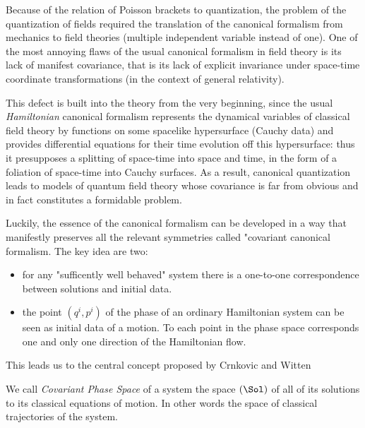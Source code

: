 \documentclass[Main]{subfiles}
\begin{document}
		Because of the relation of Poisson brackets to quantization, the problem of the quantization of fields required the translation of the canonical formalism from mechanics to field theories (multiple independent variable instead of one).
		One of the most annoying flaws of the usual canonical formalism in field theory is its lack of manifest covariance, that is its lack of explicit invariance under space-time coordinate transformations (in the context of general relativity). 
			
			This defect is built into the theory from the very beginning, since the usual \emph{Hamiltonian} canonical formalism represents the dynamical variables of classical field theory by functions on some spacelike hypersurface (Cauchy data) and provides differential equations for their time evolution off this hypersurface: 
			thus it presupposes a splitting of space-time into space and time, in the form of a foliation of space-time into Cauchy surfaces.	
			As a result, canonical quantization leads to models of quantum field theory whose covariance is far from obvious and in fact constitutes a formidable problem.
		
		Luckily, the essence of the canonical formalism can be developed in a way that manifestly preserves all the relevant symmetries called "covariant canonical formalism.
		The key idea are two:
		\begin{itemize}
			\item  for any "sufficently well behaved" system there is a one-to-one correspondence between solutions and initial data.
			\item the point $(q^i,p^i)$ of the phase of an ordinary Hamiltonian system can be seen as initial data of a motion.
						To each point in the phase space corresponds one and only one direction of the Hamiltonian flow.
		\end{itemize}
		This leads us to the central concept proposed by Crnkovic and Witten\cite{Crnkovic1999}
		
		\begin{definition}
			We call \emph{Covariant Phase Space} of a system the space $( \Sol )$ of all of its solutions to its classical equations of motion. 
			In other words the space of classical trajectories of the system. 
		\end{definition}
		
\end{document}
